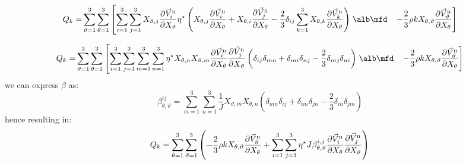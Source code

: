 %
%
\begin{align}
Q_k=& \sum_{\vartheta=1}^{3} \sum_{\theta=1}^{3}
  \left[
    \sum_{i=1}^{3} \sum_{j=1}^{3} X_{\vartheta,j} \frac{\partial \vec{V}^{\rm n}_i}{\partial X_\vartheta}
    \eta^\star
    \left(  X_{\theta,j} \frac{\partial \vec{V}^{\rm n}_i}{\partial X_\theta}
       + X_{\theta,i} \frac{\partial \vec{V}^{\rm n}_j}{\partial X_\theta} -\frac{2}{3} \delta_{ij} \sum_{k=1}^{3}  X_{\theta,k} \frac{\partial \vec{V}^{\rm n}_k}{\partial X_\theta}
    \right)
\right.\nonumber\alb\mfd
&\left.
    -\frac{2}{3} \rho k X_{\theta,\vartheta} \frac{\partial \vec{V}^{\rm n}_\vartheta}{\partial X_\theta}
  \right]
\end{align}
%

















%
\begin{align}
Q_k= &\sum_{\vartheta=1}^{3} \sum_{\theta=1}^{3}
  \left[
    \sum_{i=1}^{3} \sum_{j=1}^{3} \sum_{m=1}^{3} \sum_{n=1}^{3}
    \eta^\star X_{\theta,n} X_{\vartheta,m} \frac{\partial \vec{V}^{\rm n}_i}{\partial X_\theta} \frac{\partial \vec{V}^{\rm n}_j}{\partial X_\vartheta}
    \left(
     \delta_{ij} \delta_{mn} +\delta_{mi} \delta_{nj} - \frac{2}{3} \delta_{mj} \delta_{ni}
    \right)
\right.\nonumber\alb\mfd
&\left.
    -\frac{2}{3} \rho k X_{\theta,\vartheta} \frac{\partial \vec{V}^{\rm n}_\vartheta}{\partial X_\theta}
  \right]
\end{align}
%
we can express $\beta$ as:
%
%
\begin{equation}
  \beta_{\theta, \vartheta}^{ij}
  =\sum_{m=1}^3 \sum_{n=1}^3 \frac{1}{J}  X_{\vartheta,m} X_{\theta,n}
    \left(
      \delta_{mn}\delta_{ij}+\delta_{im}\delta_{jn}-\frac{2}{3} \delta_{in}\delta_{jm}
    \right)
\end{equation}
%
hence resulting in:
%
\begin{equation}
Q_k=\sum_{\theta=1}^{3} \sum_{\vartheta=1}^{3}
\left( -\frac{2}{3}  \rho k X_{\theta,\vartheta} \frac{\partial \vec{V}^{\rm n}_\vartheta}{\partial X_\theta}
+ \sum_{i=1}^{3} \sum_{j=1}^{3} \eta^\star
 J \beta_{\theta,\vartheta}^{i,j} \frac{\partial \vec{V}^{\rm n}_i}{\partial X_\theta} \frac{\partial \vec{V}^{\rm n}_j}{\partial X_\vartheta}\right)
\end{equation}
%


